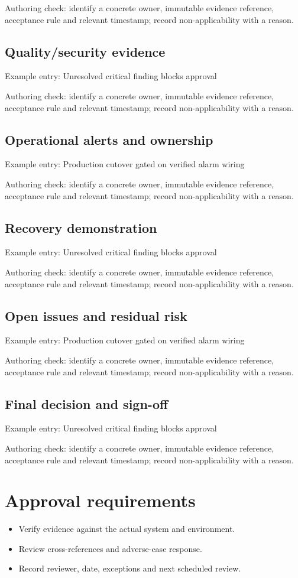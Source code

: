 \documentclass[10pt,letterpaper]{article}
\begin{document}
Authoring check: identify a concrete owner, immutable evidence reference, acceptance rule and relevant timestamp; record non-applicability with a reason.


\subsection{Quality/security evidence}
Example entry: Unresolved critical finding blocks approval

Authoring check: identify a concrete owner, immutable evidence reference, acceptance rule and relevant timestamp; record non-applicability with a reason.


\subsection{Operational alerts and ownership}
Example entry: Production cutover gated on verified alarm wiring

Authoring check: identify a concrete owner, immutable evidence reference, acceptance rule and relevant timestamp; record non-applicability with a reason.


\subsection{Recovery demonstration}
Example entry: Unresolved critical finding blocks approval

Authoring check: identify a concrete owner, immutable evidence reference, acceptance rule and relevant timestamp; record non-applicability with a reason.


\subsection{Open issues and residual risk}
Example entry: Production cutover gated on verified alarm wiring

Authoring check: identify a concrete owner, immutable evidence reference, acceptance rule and relevant timestamp; record non-applicability with a reason.


\subsection{Final decision and sign-off}
Example entry: Unresolved critical finding blocks approval

Authoring check: identify a concrete owner, immutable evidence reference, acceptance rule and relevant timestamp; record non-applicability with a reason.


\section{Approval requirements}
\begin{itemize}
\item Verify evidence against the actual system and environment.
\item Review cross-references and adverse-case response.
\item Record reviewer, date, exceptions and next scheduled review.
\end{itemize}
\end{document}
